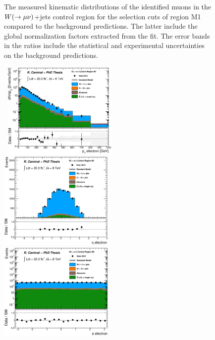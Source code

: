 \begin{figure}[!ht]
\begin{center}
{    }
  \end{center}
  \caption[Kinematic distributions of the identified muons in the $\wmn$+jets control region for the selection cuts of region M1, after the normalization factors extracted from the fit have been applied.]{The measured kinematic distributions of the identified muons in the $\wmn$+jets control region for the selection cuts of region M1 compared to the background predictions. The latter include the global normalization factors extracted from the fit. The error bands in the ratios include the statistical and experimental uncertainties on the background predictions.}
  \label{fig:Plot_M1_CRwmn_Leptonkinematics}
\end{figure}

\begin{figure}[!ht]
  \begin{center}
    \mbox{
      \includegraphics[width=0.495\textwidth]{MonojetAnalysis/Figures/plot_Stop_A6_CRele_e_pt_fitted.eps}
      \includegraphics[width=0.495\textwidth]{MonojetAnalysis/Figures/plot_Stop_A6_CRele_e_eta_fitted.eps}
    }
    \mbox{
      \includegraphics[width=0.495\textwidth]{MonojetAnalysis/Figures/plot_Stop_A6_CRele_e_phi_fitted.eps}
}
\end{center}
\end{figure}
